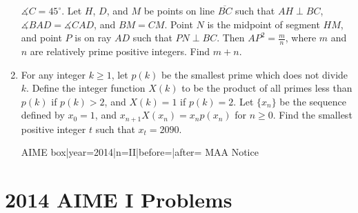\documentclass{article}
\begin{document}
\begin{enumerate}[label=\arabic*., itemsep=0.5em]
\(\measuredangle C=45^{\circ}\). Let \(H\), \(D\), and \(M\) be points on line \(\overline{BC}\) such that \(AH\perp BC\), \(\measuredangle BAD=\measuredangle CAD\), and \(BM=CM\). Point \(N\) is the midpoint of segment \(HM\), and point \(P\) is on ray \(AD\) such that \(PN\perp BC\). Then \(AP^2=\frac{m}{n}\), where \(m\) and \(n\) are relatively prime positive integers. Find \(m+n\).\par \vspace{0.5em}\item For any integer \(k\geq 1\), let \(p(k)\) be the smallest prime which does not divide \(k\). Define the integer function \(X(k)\) to be the product of all primes less than \(p(k)\) if \(p(k)>2\), and \(X(k)=1\) if \(p(k)=2\). Let \(\{x_n\}\) be the sequence defined by \(x_0=1\), and \(x_{n+1}X(x_n)=x_np(x_n)\) for \(n\geq 0\). Find the smallest positive integer \(t\) such that \(x_t=2090\). 



{{AIME box|year=2014|n=II|before=|after=}}
{{MAA Notice}}\par \vspace{0.5em}\end{enumerate}\newpage\section*{2014 AIME I Problems}
\end{document}
